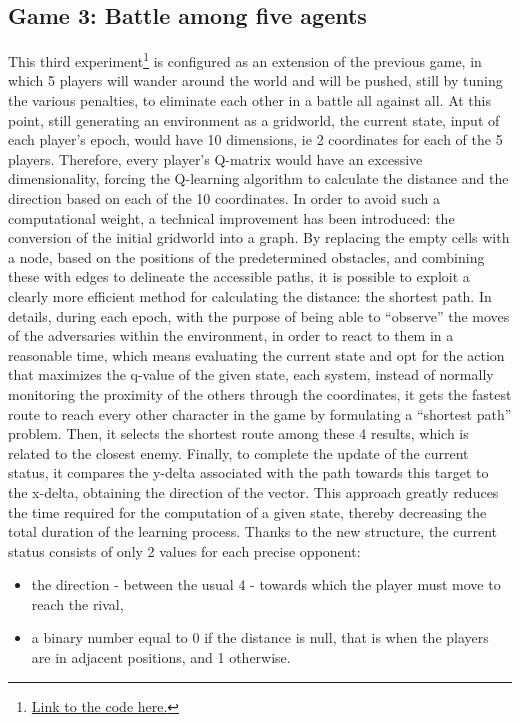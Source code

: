 \subsection{Game 3: Battle among five agents}
This third experiment\footnote{\href{https://github.com/moiraghif/DragonHunting/tree/master/Duel_2}{Link to the code here.}} is configured as an extension of the previous game, in which 5 players will wander around the world and will be pushed, still by tuning the various penalties, to eliminate each other in a battle all against all. At this point, still generating an environment as a gridworld, the current state, input of each player's epoch, would have 10 dimensions, ie 2 coordinates for each of the 5 players. Therefore, every player's Q-matrix would have an excessive dimensionality, forcing the Q-learning algorithm to calculate the distance and the direction based on each of the 10 coordinates. In order to avoid such a computational weight, a technical improvement has been introduced: the conversion of the initial gridworld into a graph. By replacing the empty cells with a node, based on the positions of the predetermined obstacles, and combining these with edges to delineate the accessible paths, it is possible to exploit a clearly more efficient method for calculating the distance: the shortest path. In details, during each epoch, with the purpose of being able to ``observe'' the moves of the adversaries within the environment, in order to react to them in a reasonable time, which means evaluating the current state and opt for the action that maximizes the q-value of the given state, each system, instead of normally monitoring the proximity of the others through the coordinates, it gets the fastest route to reach every other character in the game by formulating a ``shortest path'' problem. Then, it selects the shortest route among these 4 results, which is related to the closest enemy. Finally, to complete the update of the current status, it compares the y-delta associated with the path towards this target to the x-delta, obtaining the direction of the vector. This approach greatly reduces the time required for the computation of a given state, thereby decreasing the total duration of the learning process. Thanks to the new structure, the current status consists of only 2 values for each precise opponent:
\begin{itemize}[noitemsep, topsep=0ex]
  \item the direction - between the usual 4 - towards which the player must move to reach the rival,
  \item a binary number equal to 0 if the distance is null, that is when the players are in adjacent positions, and 1 otherwise.
\end{itemize}

